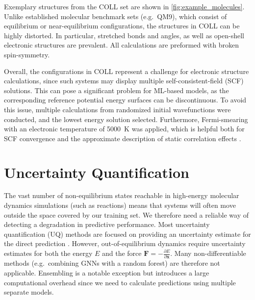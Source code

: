 \documentclass{article}
\def\vx{{\bm{x}}}
\def\mF{{\bm{F}}}
\begin{document}
Exemplary structures from the \textsc{COLL} set are shown in \cref{fig:example_molecules}. Unlike established molecular benchmark sets (e.g.\ QM9), which consist of equilibrium or near-equilibrium configurations, the structures in \textsc{COLL} can be highly distorted. In particular, stretched bonds and angles, as well as open-shell electronic structures are prevalent. All calculations are preformed with broken spin-symmetry.

Overall, the configurations in \textsc{COLL} represent a challenge for electronic structure calculations, since such systems may display multiple self-consistent-field (SCF) solutions. This can pose a significant problem for ML-based models, as the corresponding reference potential energy surfaces can be discontinuous. To avoid this issue, multiple calculations from randomized initial wavefunctions were conducted, and the lowest energy solution selected. Furthermore, Fermi-smearing with an electronic temperature of \SI{5000}{\kelvin} was applied, which is helpful both for SCF convergence and the approximate description of static correlation effects \cite{grimme_practicable_2015}.

\section{Uncertainty Quantification}

The vast number of non-equilibrium states reachable in high-energy molecular dynamics simulations (such as reactions) means that systems will often move outside the space covered by our training set. We therefore need a reliable way of detecting a degradation in predictive performance. Most uncertainty quantification (UQ) methods are focused on providing an uncertainty estimate for the direct prediction \cite{musil_fast_2019,hirschfeld_uncertainty_2020}. However, out-of-equilibrium dynamics require uncertainty estimates for both the energy $E$ and the force $\mF = -\frac{\partial E}{\partial \vx}$. Many non-differentiable methods (e.g.\ combining GNNs with a random forest) are therefore not applicable. Ensembling is a notable exception but introduces a large computational overhead since we need to calculate predictions using multiple separate models.
\end{document}
